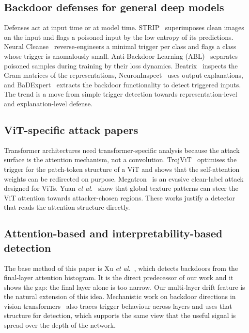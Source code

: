 \documentclass[journal]{IEEEtran}
\begin{document}
\subsection{Backdoor defenses for general deep models}
Defenses act at input time or at model time. STRIP~\cite{gao2019strip}
superimposes clean images on the input and flags a poisoned input by the low
entropy of its predictions. Neural Cleanse~\cite{wang2019neuralcleanse}
reverse-engineers a minimal trigger per class and flags a class whose trigger
is anomalously small. Anti-Backdoor Learning (ABL)~\cite{li2021abl} separates
poisoned samples during training by their loss dynamics.
Beatrix~\cite{ma2023beatrix} inspects the Gram matrices of the representations,
NeuronInspect~\cite{huang2019neuroninspect} uses output explanations, and
BaDExpert~\cite{xu2024badexpert} extracts the backdoor functionality to detect
triggered inputs. The trend is a move from simple trigger detection towards
representation-level and explanation-level defense.

\subsection{ViT-specific attack papers}
Transformer architectures need transformer-specific analysis because the attack
surface is the attention mechanism, not a convolution. TrojViT~\cite{zheng2023trojvit}
optimises the trigger for the patch-token structure of a ViT and shows that the
self-attention weights can be redirected on purpose.
Megatron~\cite{zheng2023megatron} is an evasive clean-label attack designed for
ViTs. Yuan \emph{et al.}~\cite{yuan2023catching} show that global texture
patterns can steer the ViT attention towards attacker-chosen regions. These
works justify a detector that reads the attention structure directly.

\subsection{Attention-based and interpretability-based detection}
The base method of this paper is Xu \emph{et al.}~\cite{xu2025attention}, which
detects backdoors from the final-layer attention histogram. It is the direct
predecessor of our work and it shows the gap: the final layer alone is too
narrow. Our multi-layer drift feature is the natural extension of this idea.
Mechanistic work on backdoor directions in vision
transformers~\cite{backdoordirections2024} also traces trigger behaviour across
layers and uses that structure for detection, which supports the same view that
the useful signal is spread over the depth of the network.
\end{document}
